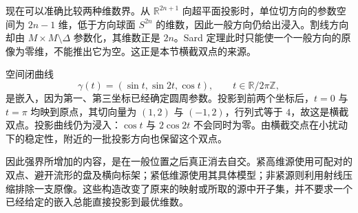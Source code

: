 现在可以准确比较两种维数界。从 \(\mathbb R^{2n+1}\) 向超平面投影时，单位切方向的参数空间为 \(2n-1\) 维，低于方向球面 \(S^{2n}\) 的维数，因此一般方向仍给出浸入。割线方向却由 \(M\times M\setminus\Delta\) 参数化，其维数正是 \(2n\)。Sard 定理此时只能使一个一般方向的原像为零维，不能推出它为空。这正是本节横截双点的来源。

\begin{example}\label{g2:exm:projection-figure-eight}
	空间闭曲线
	\[
		\gamma(t)=(\sin t,\sin2t,\cos t),\qquad t\in\mathbb R/2\pi\mathbb Z,
	\]
	是嵌入，因为第一、第三坐标已经确定圆周参数。投影到前两个坐标后，\(t=0\) 与 \(t=\pi\) 均映到原点，其切向量为 \((1,2)\) 与 \((-1,2)\)，行列式等于 \(4\)，故这是横截双点。投影曲线仍为浸入：\(\cos t\) 与 \(2\cos2t\) 不会同时为零。由横截交点在小扰动下的稳定性，附近的一批投影方向也保留这个双点。
\end{example}

因此强界所增加的内容，是在一般位置之后真正消去自交。紧高维源使用可配对的双点、避开流形的盘及横向标架；紧低维源使用其具体模型；非紧源则利用射线压缩排除一支原像。这些构造改变了原来的映射或所取的源中开子集，并不要求一个已经给定的嵌入总能直接投影到最优维数。

